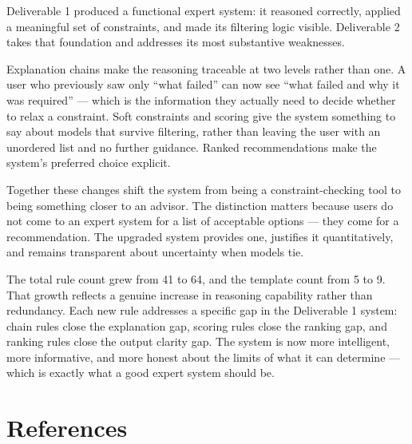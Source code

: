 \documentclass[12pt,a4paper]{article}
\begin{document}
Deliverable 1 produced a functional expert system: it reasoned correctly, applied a meaningful set of constraints, and made its filtering logic visible. Deliverable 2 takes that foundation and addresses its most substantive weaknesses.

Explanation chains make the reasoning traceable at two levels rather than one. A user who previously saw only ``what failed'' can now see ``what failed and why it was required'' --- which is the information they actually need to decide whether to relax a constraint. Soft constraints and scoring give the system something to say about models that survive filtering, rather than leaving the user with an unordered list and no further guidance. Ranked recommendations make the system's preferred choice explicit.

Together these changes shift the system from being a constraint-checking tool to being something closer to an advisor. The distinction matters because users do not come to an expert system for a list of acceptable options --- they come for a recommendation. The upgraded system provides one, justifies it quantitatively, and remains transparent about uncertainty when models tie.

The total rule count grew from 41 to 64, and the template count from 5 to 9. That growth reflects a genuine increase in reasoning capability rather than redundancy. Each new rule addresses a specific gap in the Deliverable 1 system: chain rules close the explanation gap, scoring rules close the ranking gap, and ranking rules close the output clarity gap. The system is now more intelligent, more informative, and more honest about the limits of what it can determine --- which is exactly what a good expert system should be.

\section{References}
\end{document}
